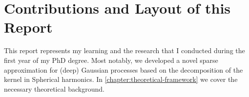 






\section{Contributions and Layout of this Report}

This report represents my learning and the research that I conducted during the first year of my PhD degree. Most notably, we developed a novel sparse approximation for (deep) Gaussian processes based on the decomposition of the kernel in Spherical harmonics. In \cref{chapter:theoretical-framework} we cover the necessary theoretical background.

